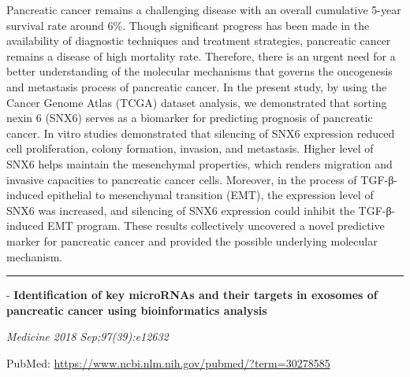 \documentclass[]{article}
\begin{document}
Pancreatic cancer remains a challenging disease with an overall
cumulative 5-year survival rate around 6\%. Though significant progress
has been made in the availability of diagnostic techniques and treatment
strategies, pancreatic cancer remains a disease of high mortality rate.
Therefore, there is an urgent need for a better understanding of the
molecular mechanisms that governs the oncogenesis and metastasis process
of pancreatic cancer. In the present study, by using the Cancer Genome
Atlas (TCGA) dataset analysis, we demonstrated that sorting nexin 6
(SNX6) serves as a biomarker for predicting prognosis of pancreatic
cancer. In vitro studies demonstrated that silencing of SNX6 expression
reduced cell proliferation, colony formation, invasion, and metastasis.
Higher level of SNX6 helps maintain the mesenchymal properties, which
renders migration and invasive capacities to pancreatic cancer cells.
Moreover, in the process of TGF-β-induced epithelial to mesenchymal
transition (EMT), the expression level of SNX6 was increased, and
silencing of SNX6 expression could inhibit the TGF-β-induced EMT
program. These results collectively uncovered a novel predictive marker
for pancreatic cancer and provided the possible underlying molecular
mechanism.

{}

{}

\begin{center}\rule{0.5\linewidth}{\linethickness}\end{center}

 - \textbf{Identification of key microRNAs and their targets in exosomes
of pancreatic cancer using bioinformatics analysis}

\emph{Medicine 2018 Sep;97(39):e12632}

PubMed: \url{https://www.ncbi.nlm.nih.gov/pubmed/?term=30278585}
\end{document}
